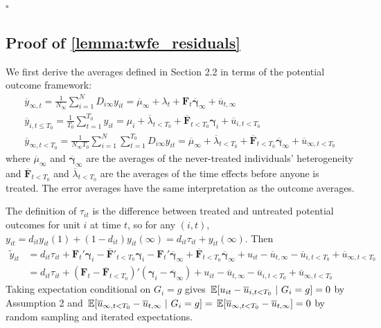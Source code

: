 \documentclass[12pt]{article}
\begin{document}
$\square$

\subsection*{Proof of \autoref{lemma:twfe_residuals}}

We first derive the averages defined in Section 2.2 in terms of the potential outcome framework:
\begin{gather*}
    \overline{y}_{\infty , t} = \frac{1}{N_{\infty}} \sum_{i = 1}^N D_{i \infty} y_{it} = \overline{\mu}_{\infty} + \lambda_t + \bm{F}_t \overline{\bm \gamma}_{\infty} + \overline{u}_{t, \infty}\\
    \overline{y}_{i,t\leq T_0} = \frac{1}{T_0} \sum_{t = 1}^{T_0} y_{it} = \mu_i + \overline{\lambda}_{t < T_0} + \overline{\bm{F}}_{t < T_0} \bm \gamma_i + \overline{u}_{i,t < T_0}\\
    \overline{y}_{\infty, t < T_0} = \frac{1}{N_{\infty} T_0} \sum_{i = 1}^N \sum_{t = 1}^{T_0} D_{i \infty} y_{it} = \overline{\mu}_{\infty} + \overline{\lambda}_{t < T_0} + \overline{\bm{F}}_{t < T_0} \overline{\bm \gamma}_{\infty} + \overline{u}_{\infty, t < T_0}
\end{gather*}
where $\overline{\mu}_{\infty}$ and $\overline{\bm \gamma}_{\infty}$ are the averages of the never-treated individuals' heterogeneity and $\overline{\bm{F}}_{t < T_0}$ and $\overline{\lambda}_{t < T_0}$ are the averages of the time effects before anyone is treated. The error averages have the same interpretation as the outcome averages.

The definition of $\tau_{it}$ is the difference between treated and untreated potential outcomes for unit $i$ at time $t$, so for any $(i,t)$, $y_{it} = d_{it} y_{it}(1) + (1-d_{it})y_{it}(\infty) = d_{it} \tau_{it} + y_{it}(\infty)$. Then
\begin{align*}
    \tilde{y}_{it} 
    &= d_{it} \tau_{it} + \bm{F}_t' \bm \gamma_i - \overline{\bm{F}}'_{t < T_0} \bm \gamma_i - \bm{F}_t' \overline{\bm \gamma}_{\infty} + \overline{\bm{F}}_{t < T_0} \overline{\bm \gamma}_{\infty} + u_{it} - \overline{u}_{t,\infty} - \overline{u}_{i, t < T_0} + \overline{u}_{\infty, t < T_0}\\
    &= d_{it} \tau_{it} + (\bm{F}_t - \overline{\bm{F}}_{t < T_0})' (\bm \gamma_i - \overline{\bm \gamma}_{\infty}) + u_{it} - \overline{u}_{t,\infty} - \overline{u}_{i, t < T_0} + \overline{u}_{\infty, t < T_0}
\end{align*}
Taking expectation conditional on $G_i = g$ gives $\expec{u_{it} - \overline{u}_{i, t < T_0}}{G_i = g} = 0$ by Assumption 2 and $\expec{\overline{u}_{\infty, t < T_0} - \overline{u}_{t, \infty} }{G_i = g} = \expec{\overline{u}_{\infty, t < T_0} - \overline{u}_{t, \infty}} = 0$ by random sampling and iterated expectations.
\end{document}
